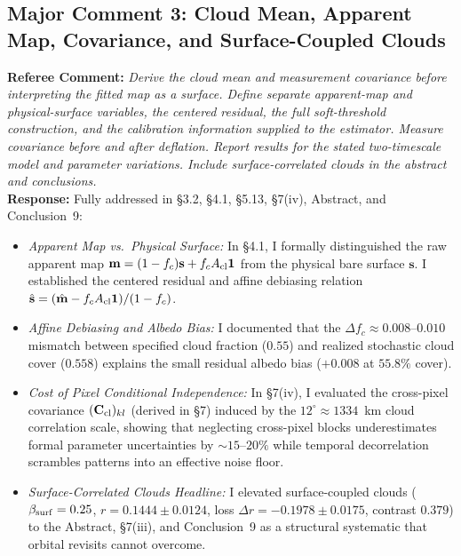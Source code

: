 \documentclass[11pt]{article}
\begin{document}
\subsection*{Major Comment 3: Cloud Mean, Apparent Map, Covariance, and Surface-Coupled Clouds}
\textbf{Referee Comment:} \textit{Derive the cloud mean and measurement covariance before interpreting the fitted map as a surface. Define separate apparent-map and physical-surface variables, the centered residual, the full soft-threshold construction, and the calibration information supplied to the estimator. Measure covariance before and after deflation. Report results for the stated two-timescale model and parameter variations. Include surface-correlated clouds in the abstract and conclusions.}\\
\textbf{Response:} Fully addressed in §3.2, §4.1, §5.13, §7(iv), Abstract, and Conclusion~9:
\begin{itemize}
    \item \textit{Apparent Map vs.\ Physical Surface:} In §4.1, I formally distinguished the raw apparent map $\mathbf{m} = (1-f_c)\mathbf{s} + f_c A_{\rm cl}\mathbf{1}$ from the physical bare surface $\mathbf{s}$. I established the centered residual and affine debiasing relation $\hat{\mathbf{s}} = (\hat{\mathbf{m}} - f_c A_{\rm cl}\mathbf{1})/(1-f_c)$.
    \item \textit{Affine Debiasing and Albedo Bias:} I documented that the $\Delta f_c \approx 0.008$--$0.010$ mismatch between specified cloud fraction ($0.55$) and realized stochastic cloud cover ($0.558$) explains the small residual albedo bias ($+0.008$ at $55.8\%$ cover).
    \item \textit{Cost of Pixel Conditional Independence:} In §7(iv), I evaluated the cross-pixel covariance $(\mathbf{C}_{\rm cl})_{kl}$ (derived in §7) induced by the $12^\circ \approx 1334$~km cloud correlation scale, showing that neglecting cross-pixel blocks underestimates formal parameter uncertainties by $\sim 15$--$20\%$ while temporal decorrelation scrambles patterns into an effective noise floor.
    \item \textit{Surface-Correlated Clouds Headline:} I elevated surface-coupled clouds ($\beta_{\rm surf}=0.25$, $r=0.1444 \pm 0.0124$, loss $\Delta r = -0.1978 \pm 0.0175$, contrast $0.379$) to the Abstract, §7(iii), and Conclusion~9 as a structural systematic that orbital revisits cannot overcome.
\end{itemize}
\end{document}
